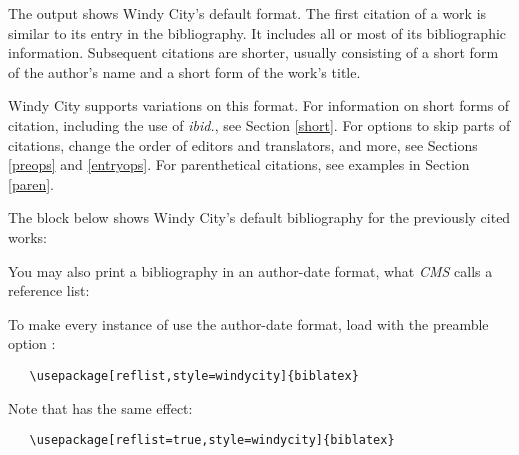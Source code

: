 \documentclass[11pt,letterpaper,oneside]{article}
\begin{document}
\begin{citeonly}
\item \cite[24--25]{morley1995}
\item \cite{schwartz1992}
\item \cite{kaiser1964}
\item \cite[43]{morley1995}
\item \cite[138]{schwartz1992}
\item \cite[189--90]{kaiser1964}
\end{citeonly}

The output shows Windy City's default format. The first citation of a
work is similar to its entry in the bibliography. It includes all or
most of its bibliographic information. Subsequent citations are
shorter, usually consisting of a short form of the author's name and a
short form of the work's title.

Windy City supports variations on this format. For information on
short forms of citation, including the use of \textit{ibid.}, see
Section \ref{short}. For options to skip parts of citations, change
the order of editors and translators, and more, see Sections
\ref{preops} and \ref{entryops}. For parenthetical citations, see
examples in Section \ref{paren}.

The block below shows Windy City's default bibliography for the
previously cited works:

\begin{bibonly}
\nocite{kaiser1964,morley1995,schwartz1992}
\end{bibonly}

\noindent You may also print a bibliography in an author-date format,
what \textit{CMS} calls a reference list:

\begin{refonly}
\nocite{kaiser1964,morley1995,schwartz1992}
\end{refonly}

To make every instance of  use the author-date
format, load \biblatex with the preamble option :

\begin{verbatim}
   \usepackage[reflist,style=windycity]{biblatex}
\end{verbatim}

\noindent Note that  has the same effect:

\begin{verbatim}
   \usepackage[reflist=true,style=windycity]{biblatex}
\end{verbatim}
\end{document}
